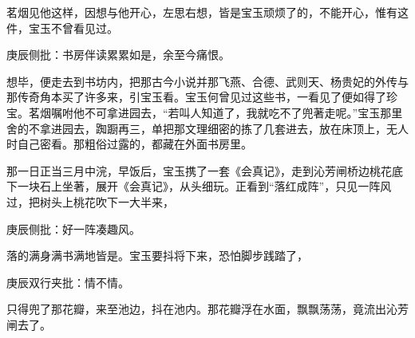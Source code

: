 \begin{parag}
    茗烟见他这样，因想与他开心，左思右想，皆是宝玉顽烦了的，不能开心，惟有这件，宝玉不曾看见过。\begin{note}庚辰侧批：书房伴读累累如是，余至今痛恨。\end{note}想毕，便走去到书坊内，把那古今小说并那飞燕、合德、武则天、杨贵妃的外传与那传奇角本买了许多来，引宝玉看。宝玉何曾见过这些书，一看见了便如得了珍宝。茗烟嘱咐他不可拿进园去，“若叫人知道了，我就吃不了兜著走呢。”宝玉那里舍的不拿进园去，踟蹰再三，单把那文理细密的拣了几套进去，放在床顶上，无人时自己密看。那粗俗过露的，都藏在外面书房里。
\end{parag}


\begin{parag}
    那一日正当三月中浣，早饭后，宝玉携了一套《会真记》，走到沁芳闸桥边桃花底下一块石上坐著，展开《会真记》，从头细玩。正看到“落红成阵”，只见一阵风过，把树头上桃花吹下一大半来，\begin{note}庚辰侧批：好一阵凑趣风。\end{note}落的满身满书满地皆是。宝玉要抖将下来，恐怕脚步践踏了，\begin{note}庚辰双行夹批：情不情。\end{note}只得兜了那花瓣，来至池边，抖在池内。那花瓣浮在水面，飘飘荡荡，竟流出沁芳闸去了。
\end{parag}


